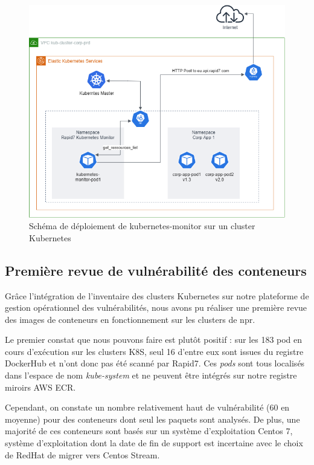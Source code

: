 \begin{figure}[h]
    \centering
    \includegraphics[width=\linewidth]{resources/img/k8s_scanner_archi.png}
    \caption{Schéma de déploiement de kubernetes-monitor sur un cluster Kubernetes}
    \label{figure:k8sscannerarchi}
\end{figure}

\subsection{Première revue de vulnérabilité des conteneurs}

Grâce l'intégration de l'inventaire des clusters Kubernetes sur notre plateforme de gestion opérationnel des vulnérabilités,
nous avons pu réaliser une première revue des images de conteneurs en fonctionnement sur les clusters de \ac{npr}.

Le premier constat que nous pouvons faire est plutôt positif : sur les 183 pod en cours d'exécution sur les clusters 
\ac{K8S}, seul 16 d'entre eux sont issues du registre DockerHub et n'ont donc pas été scanné par Rapid7.
\newline Ces \emph{pods} sont tous localisés dans l'espace de nom \emph{kube-system} et ne peuvent être intégrés sur notre
registre miroirs \ac{AWS} \ac{ECR}.

Cependant, on constate un nombre relativement haut de vulnérabilité (60 en moyenne) pour des conteneurs dont seul les 
paquets sont analysés. De plus, une majorité de ces conteneurs sont basés sur un système d'exploitation Centos 7,
système d'exploitation dont la date de fin de support est incertaine avec le choix de RedHat de migrer vers Centos Stream.

